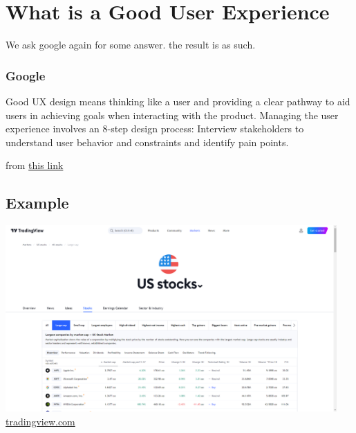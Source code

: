 \documentclass[12pt,titlepage]{article}
\begin{document}
\newpage

\section{What is a Good User Experience}
We ask google again for some answer. the result is as such.

\subsubsection*{Google}
Good UX design means thinking like a user and providing a clear pathway to aid users in achieving goals when interacting with the product. Managing the user experience involves an 8-step design process: Interview stakeholders to understand user behavior and constraints and identify pain points.

from \href{https://www.netsolutions.com/insights/good-ux-ui-design/#:~:text=Good%20UX%20design%20means%20thinking,constraints%20and%20identify%20pain%20points.}{this link}

\subsection*{Example}

\includegraphics[width=0.95\textwidth]{images/figures/fig2.png}\\
\href{https://www.tradingview.com}{tradingview.com}
\end{document}
